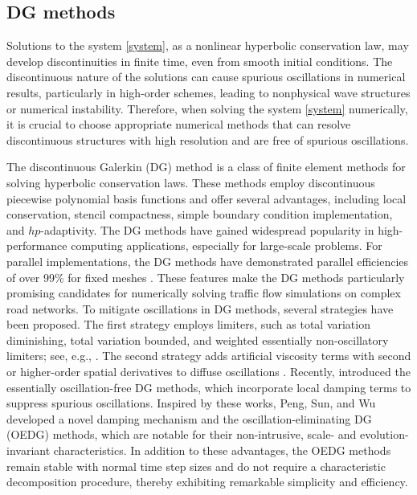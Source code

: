 \documentclass[times,final]{elsarticle}
\numberwithin{equation}{section}
\theoremstyle{definition}
\theoremstyle{remark}
\begin{document}
\subsection{DG methods}

Solutions to the system \eqref{system}, as a nonlinear hyperbolic conservation law, may develop discontinuities in finite time, even from smooth initial conditions. The discontinuous nature of the solutions can cause spurious oscillations in numerical results, particularly in high-order schemes, leading to nonphysical wave structures or numerical instability. Therefore, when solving the system \eqref{system} numerically, it is crucial to choose appropriate numerical methods that can resolve discontinuous structures with high resolution and are free of spurious oscillations.

The discontinuous Galerkin (DG) method is a class of finite element methods for solving hyperbolic conservation laws. These methods employ discontinuous piecewise polynomial basis functions and offer several advantages, including local conservation, stencil compactness, simple boundary condition implementation, and $hp$-adaptivity. 
The DG methods have gained widespread popularity in high-performance computing applications, especially for large-scale problems. For parallel implementations, the DG methods have demonstrated parallel efficiencies of over 99\% for fixed meshes \cite{BiswasDevineFlaherty1994}. These features make the DG methods particularly promising candidates for numerically solving traffic flow simulations on complex road networks. 
To mitigate oscillations in DG methods, several strategies have been proposed. The first strategy employs limiters, such as total variation diminishing, total variation bounded, and weighted essentially non-oscillatory limiters; see, e.g., \cite{zhong2013simple,shu2009discontinuous,qiu2005runge}. The second strategy adds artificial viscosity terms with second or higher-order spatial derivatives to diffuse oscillations  \cite{hiltebrand2014entropy,huang2020adaptive,yu2020study,zingan2013implementation}.  
Recently, \cite{liu2022essentially,lu2021oscillation} introduced the essentially oscillation-free DG methods, which incorporate local damping terms to suppress spurious oscillations. 
Inspired by these works, Peng, Sun, and Wu \cite{peng2023oedg} developed a novel damping mechanism and the oscillation-eliminating DG (OEDG) methods, which are notable for their non-intrusive, scale- and evolution-invariant characteristics.
In addition to these advantages, the OEDG methods remain stable with normal time step sizes and do not require a characteristic decomposition procedure, thereby exhibiting remarkable simplicity and efficiency. 
\end{document}
